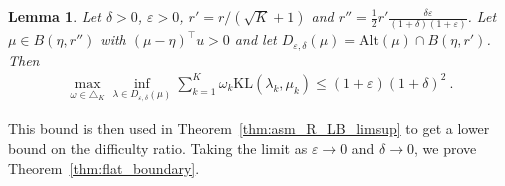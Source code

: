 \documentclass{article}
\newcommand{\KL}{\mathrm{KL}}
\newcommand{\alt}{\mathrm{Alt}}
\newtheorem{lemma}{Lemma}
\begin{document}
\begin{lemma}
Let $\delta > 0$, $\varepsilon > 0$, $r' = r / (\sqrt{K} + 1)$ and $r'' = \frac{1}{2} r' \frac{\delta \varepsilon}{(1 + \delta) (1 + \varepsilon)}$.
Let $\mu \in B(\eta, r'')$ with $(\mu - \eta)^\top u > 0$ and let $D_{\varepsilon, \delta}(\mu) = \alt(\mu)\cap B(\eta, r')$. Then
\begin{align*}
\max_{\omega \in \triangle_K} \inf_{\lambda \in D_{\varepsilon, \delta}(\mu)} \sum_{k=1}^K \omega_k \KL(\lambda_k, \mu_k)
\le (1 + \varepsilon) (1 + \delta)^2 \: .
\end{align*}
\end{lemma}

This bound is then used in Theorem~\ref{thm:asm_R_LB_limsup} to get a lower bound on the difficulty ratio. Taking the limit as $\varepsilon \to 0$ and $\delta \to 0$, we prove Theorem~\ref{thm:flat_boundary}.
\end{document}
